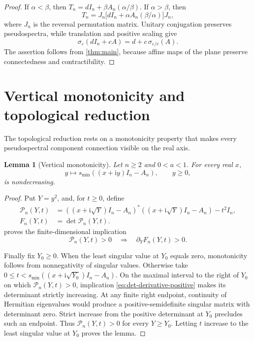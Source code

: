 \documentclass[a4paper,preprint,12pt,nopreprintline,sort&compress]{elsarticle}
\numberwithin{equation}{section}
\newtheorem{lemma}[theorem]{Lemma}
\theoremstyle{remark}
\newcommand{\ii}{\mathrm i}
\begin{document}
\begin{proof}
If \(\alpha<\beta\), then
\(T_n=dI_n+\beta A_n(\alpha/\beta)\).  If \(\alpha>\beta\), then
\[
 T_n=J_n\bigl[dI_n+\alpha A_n(\beta/\alpha)\bigr]J_n,
\]
where \(J_n\) is the reversal permutation matrix.  Unitary conjugation
preserves pseudospectra, while translation and positive scaling give
\[
 \sigma_\varepsilon(dI_n+cA)=d+c\,\sigma_{\varepsilon/c}(A).
\]
The assertion follows from \cref{thm:main}, because affine maps of the
plane preserve connectedness and contractibility.
\end{proof}

\section{Vertical monotonicity and topological reduction}
\label{sec:vertical}

The topological reduction rests on a monotonicity property that makes every
pseudospectral component connection visible on the real axis.

\begin{lemma}[Vertical monotonicity]\label{lem:vertical}
Let \(n\geq2\) and \(0<a<1\).  For every real \(x\),
\[
 y\longmapsto s_{\min}((x+\ii y)I_n-A_n),\qquad y\geq0,
\]
is nondecreasing.
\end{lemma}

\begin{proof}
Put \(Y=y^2\), and, for \(t\geq0\), define
\[
 \begin{aligned}
 \mathcal P_n(Y,t)
 &=((x+\ii\sqrt Y)I_n-A_n)^*
   ((x+\ii\sqrt Y)I_n-A_n)-t^2I_n,\\
 F_n(Y,t)&=\det \mathcal P_n(Y,t).
 \end{aligned}
\]
 proves the finite-dimensional
implication
\begin{equation}\label{eq:det-derivative-positive}
 \mathcal P_n(Y,t)>0\quad\Longrightarrow\quad
 \partial_YF_n(Y,t)>0.
\end{equation}

Finally fix \(Y_0\geq0\).  When the least singular value at \(Y_0\) equals
zero, monotonicity follows from nonnegativity of singular values.  Otherwise
take \(0\leq t<s_{\min}((x+\ii\sqrt{Y_0})I_n-A_n)\).  On the maximal interval
to the right of \(Y_0\) on which \(\mathcal P_n(Y,t)>0\), implication
\eqref{eq:det-derivative-positive} makes its determinant strictly increasing.
At any finite right endpoint, continuity of Hermitian eigenvalues would
produce a positive-semidefinite singular matrix with determinant zero.
Strict increase from the positive determinant at \(Y_0\) precludes such an
endpoint.
Thus \(\mathcal P_n(Y,t)>0\) for every \(Y\geq Y_0\).  Letting \(t\) increase to
the least singular value at \(Y_0\) proves the lemma.
\end{proof}
\end{document}
